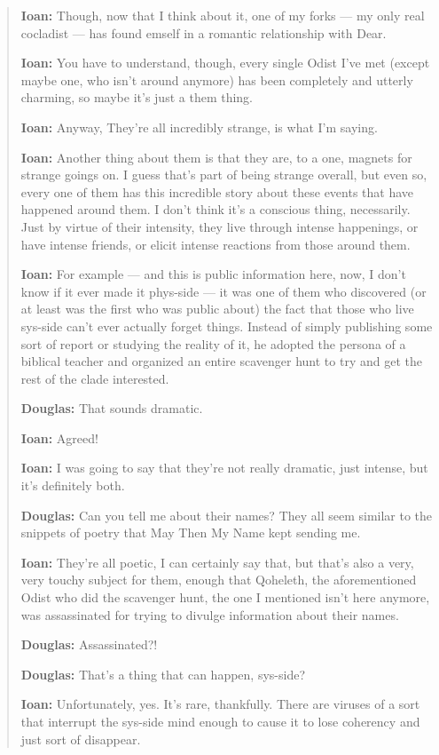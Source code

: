 \begin{quote}
\textbf{Ioan:} Though, now that I think about it, one of my forks — my only real cocladist — has found emself in a romantic relationship with Dear.

\textbf{Ioan:} You have to understand, though, every single Odist I've met (except maybe one, who isn't around anymore) has been completely and utterly charming, so maybe it's just a them thing.

\textbf{Ioan:} Anyway, They're all incredibly strange, is what I'm saying.

\textbf{Ioan:} Another thing about them is that they are, to a one, magnets for strange goings on. I guess that's part of being strange overall, but even so, every one of them has this incredible story about these events that have happened around them. I don't think it's a conscious thing, necessarily. Just by virtue of their intensity, they live through intense happenings, or have intense friends, or elicit intense reactions from those around them.

\textbf{Ioan:} For example — and this is public information here, now, I don't know if it ever made it phys-side — it was one of them who discovered (or at least was the first who was public about) the fact that those who live sys-side can't ever actually forget things. Instead of simply publishing some sort of report or studying the reality of it, he adopted the persona of a biblical teacher and organized an entire scavenger hunt to try and get the rest of the clade interested.

\textbf{Douglas:} That sounds dramatic.

\textbf{Ioan:} Agreed!

\textbf{Ioan:} I was going to say that they're not really dramatic, just intense, but it's definitely both.

\textbf{Douglas:} Can you tell me about their names? They all seem similar to the snippets of poetry that May Then My Name kept sending me.

\textbf{Ioan:} They're all poetic, I can certainly say that, but that's also a very, very touchy subject for them, enough that Qoheleth, the aforementioned Odist who did the scavenger hunt, the one I mentioned isn't here anymore, was assassinated for trying to divulge information about their names.

\textbf{Douglas:} Assassinated?!

\textbf{Douglas:} That's a thing that can happen, sys-side?

\textbf{Ioan:} Unfortunately, yes. It's rare, thankfully. There are viruses of a sort that interrupt the sys-side mind enough to cause it to lose coherency and just sort of disappear.


\end{quote}
